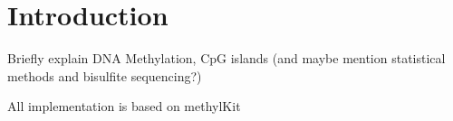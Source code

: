 \section{Introduction}

Briefly explain DNA Methylation, CpG islands (and maybe mention statistical methods and bisulfite sequencing?)

All implementation is based on methylKit \cite{23034086}
  
  
  
  
  
  
  
  
  